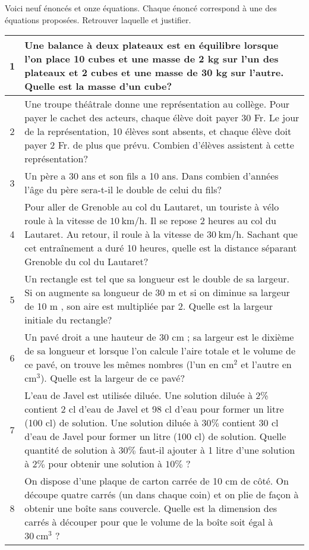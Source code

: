 \documentclass[a4paper,12pt]{report}
\begin{document}
Voici neuf énoncés et onze équations. Chaque énoncé correspond à une des équations proposées. Retrouver laquelle et justifier.
\vspace{5pt}

\begin{tabularx}{\textwidth}{|c|X|}
\hline 1 & Une balance à deux plateaux est en équilibre lorsque l'on place 10 cubes et une masse de 2 kg sur l'un des plateaux et 2 cubes et une masse de 30 kg sur l'autre. Quelle est la masse d'un cube? \\
\hline 2 & Une troupe théâtrale donne une représentation au collège. Pour payer le cachet des acteurs, chaque élève doit payer 30 Fr. Le jour de la représentation, 10 élèves sont absents, et chaque élève doit payer 2 Fr. de plus que prévu. Combien d'élèves assistent à cette représentation? \\
\hline 3 & Un père a 30 ans et son fils a 10 ans. Dans combien d'années l'âge du père sera-t-il le double de celui du fils? \\
\hline 4 & Pour aller de Grenoble au col du Lautaret, un touriste à vélo roule à la vitesse de $10 \mathrm{~km} / \mathrm{h}$. Il se repose 2 heures au col du Lautaret. Au retour, il roule à la vitesse de $30 \mathrm{~km} / \mathrm{h}$. Sachant que cet entraînement a duré 10 heures, quelle est la distance séparant Grenoble du col du Lautaret? \\
\hline 5 & Un rectangle est tel que sa longueur est le double de sa largeur. Si on augmente sa longueur de 30 m et si on diminue sa largeur de 10 m , son aire est multipliée par 2. Quelle est la largeur initiale du rectangle? \\
\hline 6 & Un pavé droit a une hauteur de 30 cm ; sa largeur est le dixième de sa longueur et lorsque l'on calcule l'aire totale et le volume de ce pavé, on trouve les mêmes nombres (l'un en $\mathrm{cm}^2$ et l'autre en $\mathrm{cm}^3$). Quelle est la largeur de ce pavé? \\
\hline 7 & L'eau de Javel est utilisée diluée. Une solution diluée à 2\% contient 2 cl d'eau de Javel et 98 cl d'eau pour former un litre (100 cl) de solution. Une solution diluée à $30 \%$ contient 30 cl d'eau de Javel pour former un litre (100 cl) de solution. Quelle quantité de solution à $30 \%$ faut-il ajouter à 1 litre d'une solution à $2 \%$ pour obtenir une solution à $10 \%$ ? \\
\hline 8 & On dispose d'une plaque de carton carrée de 10 cm de côté. On découpe quatre carrés (un dans chaque coin) et on plie de façon à obtenir une boîte sans couvercle. Quelle est la dimension des carrés à découper pour que le volume de la boîte soit égal à $30 \mathrm{~cm}^3$ ? \\

\end{tabularx}
\end{document}
